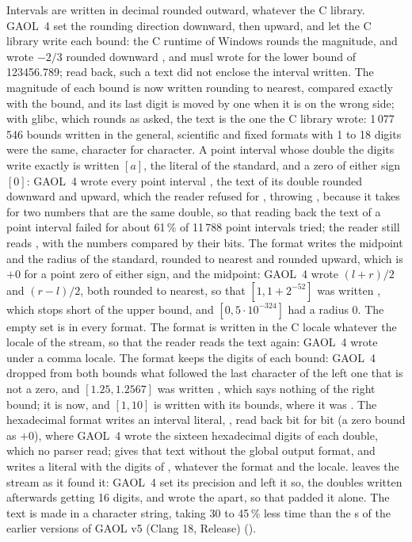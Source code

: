 \medskip
Intervals are written in decimal rounded outward, whatever the C
library.\newinvfive{} GAOL~4 set the rounding direction downward, then
upward, and let the C library write each bound: the C runtime of Windows
rounds the magnitude, and wrote $-2/3$ rounded downward , and
musl wrote  for the lower bound of 123456.789; read back,
such a text did not enclose the interval written. The magnitude of each
bound is now written rounding to nearest, compared exactly with the bound,
and its last digit is moved by one when it is on the wrong side; with glibc,
which rounds as asked, the text is the one the C library wrote: 1\,077\,546
bounds written in the general, scientific and fixed formats with 1 to 18 digits
were the same, character for character. A
point interval whose double the digits write exactly is written $[a]$, the
literal of the standard, and a zero of either sign $[0]$: GAOL~4 wrote every
point interval , the text of its double rounded downward and
upward, which the reader refused for , throwing
, because it takes  for two numbers
that are the same double, so that reading back the text of a point interval
failed for about 61\,\% of 11\,788 point intervals tried; the reader still reads , with the numbers
compared by their bits. The format  writes the midpoint and
the radius of the standard,  rounded to nearest and
 rounded upward, which is $+0$ for a point zero of either sign, and
 the midpoint: GAOL~4 wrote
$(l + r)/2$ and $(r - l)/2$, both rounded to nearest, so that $[1, 1 +
2^{-52}]$ was written , which stops short
of the upper bound, and $[0, 5 \cdot 10^{-324}]$ had a radius 0. The empty
set is \code{[empty]} in every format. The format  is
written in the C locale whatever the locale of the stream, so that the reader
reads the text again: GAOL~4 wrote \code{[0,25, 0,5]} under a comma locale.
The format  keeps the digits of each bound: GAOL~4 dropped
from both bounds what followed the last character of the left one that is
not a zero, and $[1.25, 1.2567]$ was written \code{1.25\textasciitilde{}[, ]}, which says
nothing of the right bound; it is \code{1.25\textasciitilde{}[0, 67]} now, and $[1, 10]$
is written with its bounds, where it was \code{1\textasciitilde{}[., 0]}. The hexadecimal
format writes an interval literal, \code{[0x1.999999999999ap-4, ...]}, read
back bit for bit (a zero bound as $+0$), where GAOL~4 wrote the sixteen
hexadecimal digits of each double, which no parser read;  gives that text
without the global output format, and 
writes a literal with the digits of , whatever
the format and the locale.  leaves the stream as it found
it: GAOL~4 set its precision and left it so, the doubles written afterwards
getting 16 digits, and wrote the \code{[} apart, so that
 padded it alone. The text is made in a character string,
taking 30 to 45\,\% less time than the s of the earlier
versions of GAOL v5 (Clang 18, Release) ().

